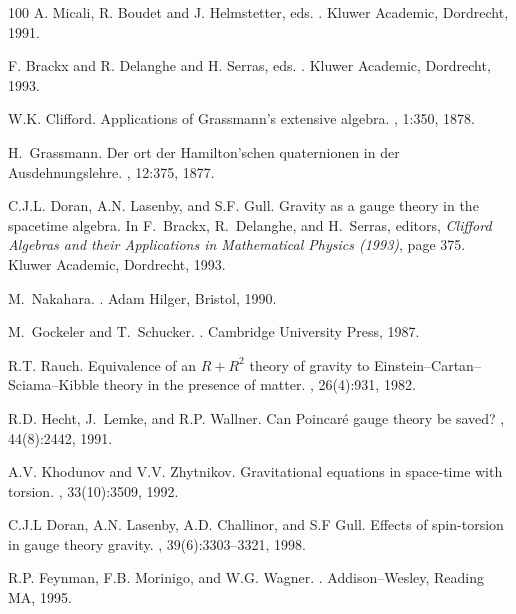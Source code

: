 \documentclass[a4paper]{article}
\numberwithin{equation}{section}
\begin{document}
\begin{thebibliography}{100}
{A. Micali, R. Boudet and J. Helmstetter, eds.}
.
\newblock Kluwer Academic, Dordrecht, 1991.

{F. Brackx and R. Delanghe and H. Serras, eds.}
.
\newblock Kluwer Academic, Dordrecht, 1993.

W.K. Clifford.
\newblock Applications of {G}rassmann's extensive algebra.
, 1:350, 1878.

H.~{G}rassmann.
\newblock Der ort der {H}amilton'schen quaternionen in der
  {A}us\-dehnung\-slehre.
, 12:375, 1877.

C.J.L. Doran, A.N. Lasenby, and S.F. Gull.
\newblock Gravity as a gauge theory in the spacetime algebra.
\newblock In F.~Brackx, R.~Delanghe, and H.~Serras, editors, {\em Clifford
  Algebras and their Applications in Mathematical Physics (1993)}, page 375.
  Kluwer Academic, Dordrecht, 1993.

M.~Nakahara.
.
\newblock Adam Hilger, Bristol, 1990.

M.~Gockeler and T.~Schucker.
.
\newblock Cambridge University Press, 1987.

R.T. Rauch.
\newblock Equivalence of an {$R+R^2$} theory of gravity to
  {E}instein--{C}artan--{S}ciama--{K}ibble theory in the presence of matter.
, 26(4):931, 1982.

R.D. Hecht, J.~Lemke, and R.P. Wallner.
\newblock Can {P}oincar\'{e} gauge theory be saved?
, 44(8):2442, 1991.

A.V. Khodunov and V.V. Zhytnikov.
\newblock Gravitational equations in space-time with torsion.
, 33(10):3509, 1992.

C.J.L Doran, A.N. Lasenby, A.D. Challinor, and S.F Gull.
\newblock Effects of spin-torsion in gauge theory gravity.
, 39(6):3303--3321, 1998.

R.P. Feynman, F.B. Morinigo, and W.G. Wagner.
.
\newblock Addison--Wesley, Reading MA, 1995.


\end{thebibliography}
\end{document}
